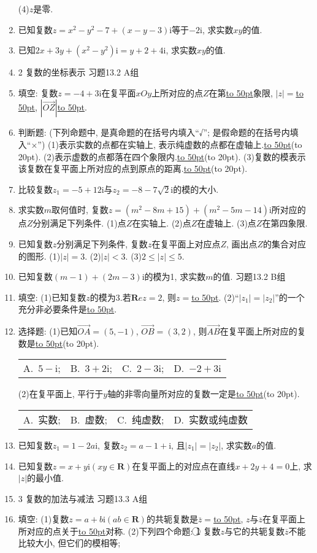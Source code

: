 \documentclass[10pt,a4paper]{article}
\newcommand{\blank}[1]{\underline{\hbox to #1pt{}}}
\newcommand{\bracket}[1]{(\hbox to #1pt{})}
\newcommand{\fourch}[4]{\par\begin{tabular}{p{.23\textwidth}p{.23\textwidth}p{.23\textwidth}p{.23\textwidth}}
A.~#1 &B.~#2& C.~#3& D.~#4
\end{tabular}}
\begin{document}
\begin{enumerate}[1.]
(4)$z$是零.
\item 已知复数$z=x^2-y^2-7+(x-y-3)\mathrm{i}$等于$-2\mathrm{i}$, 求实数$xy$的值.
\item 已知$2x+3y+(x^2-y^2)\mathrm{i}=y+2+4\mathrm{i}$, 求实数$xy$的值.
\item 2  复数的坐标表示
习题13.2  A组
\item 填空:
复数$z=-4+3\mathrm{i}$在复平面$xOy$上所对应的点$Z$在第\blank{50}象限, $|z|=$\blank{50}, $|\overrightarrow{OZ}|$\blank{50}.
\item 判断题: (下列命题中, 是真命题的在括号内填入``√''; 是假命题的在括号内填入``×'')
(1)表示实数的点都在实轴上, 表示纯虚数的点都在虚轴上.\blank{50}\bracket{20}.
(2)表示虚数的点都落在四个象限内.\blank{50}\bracket{20}.
(3)复数的模表示该复数在复平面上所对应的点到原点的距离.\blank{50}\bracket{20}.
\item 比较复数$z_1=-5+12\mathrm{i}$与$z_2=-8-7\sqrt 2\mathrm{i}$的模的大小.
\item 求实数$m$取何值时, 复数$z=(m^2-8m+15)+(m^2-5m-14)\mathrm{i}$所对应的点$Z$分别满足下列条件.
(1)点$Z$在实轴上.
(2)点$Z$在虚轴上.
(3)点$Z$在第四象限.
\item 已知复数$z$分别满足下列条件, 复数$z$在复平面上对应点$Z$, 画出点$Z$的集合对应的图形.
(1)$|z|=3$.								(2)$|z|<3$.
(3)$2\le|z|\le 5$.
\item 已知复数$(m-1)+(2m-3)\mathrm{i}$的模为1, 求实数$m$的值.
习题13.2  B组
\item 填空:
(1)已知复数$z$的模为3.若$\mathbf Rez=2$, 则$z=$\blank{50}.
(2)``$|z_1|=|z_2|$''的一个充分非必要条件是\blank{50}.
\item 选择题:
(1)已知$\overrightarrow{OA}=(5,-1)$, $\overrightarrow{OB}=(3,2)$, 则$\overrightarrow{AB}$在复平面上所对应的复数是\blank{50}\bracket{20}.
\fourch{$5-\mathrm{i}$;}{$3+2\mathrm{i}$;}{$2-3\mathrm{i}$;}{$-2+3\mathrm{i}$}
(2)在复平面上, 平行于$y$轴的非零向量所对应的复数一定是\blank{50}\bracket{20}.
\fourch{实数;}{虚数;}{纯虚数;}{实数或纯虚数}
\item 已知复数$z_1=1-2a\mathrm{i}$, 复数$z_2=a-1+\mathrm{i}$, 且$|z_1|=|z_2|$, 求实数$a$的值.
\item 已知复数$z=x+y\mathrm{i}(xy\in \mathbf{R})$在复平面上的对应点在直线$x+2y+4=0$上, 求$|z|$的最小值.
\item 3  复数的加法与减法
习题13.3  A组
\item 填空:
(1)复数$z=a+b\mathrm{i}(ab\in \mathbf{R})$的共轭复数是$\overline  z=$\blank{50}, $z$与$\overline  z$在复平面上所对应的点关于\blank{50}对称.
(2)下列四个命题:
\textcircled{1} 复数$z$与它的共轭复数$\overline  z$不能比较大小, 但它们的模相等;

\end{enumerate}
\end{document}
